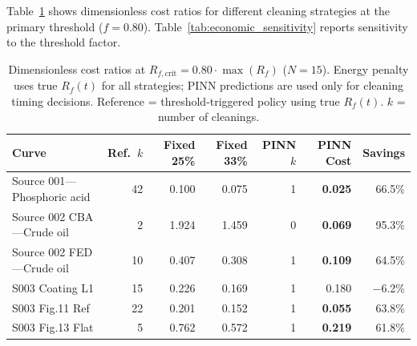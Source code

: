 \documentclass[review]{elsarticle}
\begin{document}
Table~\ref{tab:economic} shows dimensionless cost ratios for different cleaning strategies at the primary threshold ($f = 0.80$). Table~\ref{tab:economic_sensitivity} reports sensitivity to the threshold factor.

\begin{table}[htbp]
\centering
\caption{Dimensionless cost ratios at $R_{f,\text{crit}} = 0.80 \cdot \max(R_f)$ ($N=15$). Energy penalty uses true $R_f(t)$ for all strategies; PINN predictions are used only for cleaning timing decisions. Reference = threshold-triggered policy using true $R_f(t)$. $k$ = number of cleanings.}
\label{tab:economic}
\begin{tabular}{@{}p{3.2cm}rrrrrr@{}}
\toprule
Curve & Ref.\ $k$ & Fixed 25\% & Fixed 33\% & PINN $k$ & PINN Cost & Savings \\
\midrule
Source 001---Phosphoric acid & 42 & 0.100 & 0.075 & 1 & \textbf{0.025} & 66.5\% \\
Source 002 CBA---Crude oil & 2 & 1.924 & 1.459 & 0 & \textbf{0.069} & 95.3\% \\
Source 002 FED---Crude oil & 10 & 0.407 & 0.308 & 1 & \textbf{0.109} & 64.5\% \\
S003 Coating L1 & 15 & 0.226 & 0.169 & 1 & 0.180 & $-$6.2\% \\
S003 Fig.11 Ref & 22 & 0.201 & 0.152 & 1 & \textbf{0.055} & 63.8\% \\
S003 Fig.13 Flat & 5 & 0.762 & 0.572 & 1 & \textbf{0.219} & 61.8\% \\
\bottomrule
\end{tabular}
\end{table}
\end{document}
